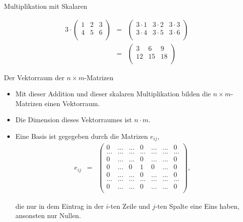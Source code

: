 \documentclass[german]{beamer}
\newcommand{\bq}{\begin{eqnarray*}}
\newcommand{\eq}{\end{eqnarray*}}
\begin{document}
\begin{frame}{Multiplikation mit Skalaren}

\begin{example}
\bq
 3 \cdot
\left( \begin{array}{ccc}
 1 & 2 & 3 \\
 4 & 5 & 6 \\
\end{array} \right)
 & = &
\left( \begin{array}{ccc}
 3 \cdot 1 & 3 \cdot 2 & 3 \cdot 3 \\
 3 \cdot 4 & 3 \cdot 5 & 3 \cdot 6 \\
\end{array} \right)
 \nonumber \\
 & = &
\left( \begin{array}{ccc}
 3 & 6 & 9 \\
 12 & 15 & 18 \\
\end{array} \right)
\eq
\end{example}

\end{frame}

\begin{frame}{Der Vektorraum der $n \times m$-Matrizen}

\begin{itemize}
\item Mit dieser Addition und dieser skalaren Multiplikation bilden die $n\times m$-Matrizen einen Vektorraum.

\item Die Dimension dieses Vektorraumes ist $n \cdot m$.

\item Eine Basis ist gegegeben durch die Matrizen $e_{ij}$,
{\small
\bq
 e_{ij} & = &
\left( \begin{array}{ccccccc}
 0 & ... & ... & 0 & ... & ... & 0 \\
 ... & ... & ... & ... & ... & ... & ...\\
 0 & ... & ... & 0 & ... & ... & 0 \\
 0 & ... & 0 & 1 & 0 & ... & 0 \\
 0 & ... & ... & 0 & ... & ... & 0 \\
 ... & ... & ... & ... & ... & ... & ...\\
 0 & ... & ... & 0 & ... & ... & 0 \\
\end{array} \right),
\eq
}

die nur in dem Eintrag in der $i$-ten Zeile und $j$-ten Spalte eine Eins haben, ansonsten nur Nullen.

\end{itemize}

\end{frame}
\end{document}
